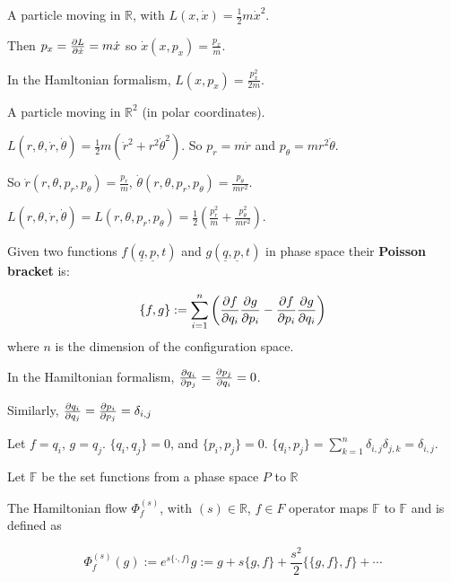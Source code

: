 \begin{example}
	A particle moving in $\mathbb{R}$, with $L(x, \dot{x}) = \frac{1}{2} m \dot{x}^2$.

	Then $p_x = \diffp{L}{\dot{x}} = m \dot{x}$ so $\dot{x}(x, p_x) = \frac{p_x}{m}$.

	In the Hamltonian formalism, $L(x, p_x) = \frac{p_x^2}{2m}$.
\end{example}

\begin{example}
	A particle moving in $\mathbb{R}^2$ (in polar coordinates).

	$L(r, \theta, \dot{r}, \dot{\theta}) = \frac{1}{2} m (\dot{r}^2 + r^2 \dot{\theta}^2)$. So $p_r = m\dot{r}$ and $p_{\theta} = m r^2 \dot{\theta}$.

	So $\dot{r}(r, \theta, p_r, p_{\theta}) = \frac{p_r}{m}$, $\dot{\theta}(r, \theta, p_r, p_{\theta}) = \frac{p_{\theta}}{m r^2}$.

	$L(r, \theta, \dot{r}, \dot{\theta}) = L(r, \theta, p_r, p_{\theta}) = \frac{1}{2} (\frac{p_r^2}{m} + \frac{p_{\theta}^2}{m r^2})$.
\end{example}

\begin{definition}
	Given two functions $f(\underline{q}, \underline{p}, t)$ and $g(\underline{q}, \underline{p}, t)$ in phase space their \textbf{Poisson bracket} is:

	\[ \{f, g\} := \sum_{i = 1}^n \left( \diffp{f}{q_i} \diffp{g}{p_i} - \diffp{f}{p_i} \diffp{g}{q_i} \right)\] where $n$ is the dimension of the configuration space.
\end{definition}

\begin{remark}
	In the Hamiltonian formalism, $\diffp{q_i}{p_j} = \diffp{p_j}{q_i} = 0$.

	Similarly, $\diffp{q_i}{q_j} = \diffp{p_i}{p_j} = \delta_{i, j}$
\end{remark}

\begin{example}
	Let $f = q_i$, $g = q_j$. $\{q_i, q_j\} = 0$, and $\{p_i, p_j\} = 0$. $\{q_i, p_j\} = \sum_{k = 1}^n \delta_{i, j} \delta_{j, k} = \delta_{i, j}$.
\end{example}

\begin{definition}
	Let $\mathbb{F}$ be the set functions from a phase space $P$ to $\mathbb{R}$
\end{definition}

\begin{definition}
	The Hamiltonian flow $\Phi_f^{(s)}$, with $(s) \in \mathbb{R}$, $f \in F$ operator maps $\mathbb{F}$ to $\mathbb{F}$ and is defined as

	\[ \Phi_f^{(s)} (g) := e^{s \{\cdot, f\}} g := g + s \{g, f\} + \frac{s^2}{2} \{ \{g, f\}, f\} + \cdots \]
\end{definition}

